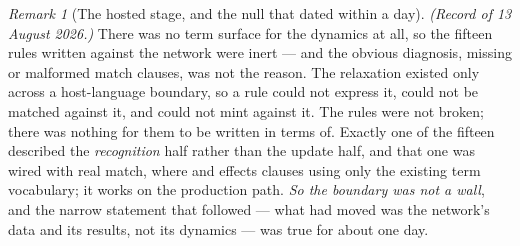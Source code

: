\documentclass[11pt,a4paper]{article}
\theoremstyle{remark}
\newtheorem{remark}[definition]{Remark}
\begin{document}
\begin{remark}[The hosted stage, and the null that dated within a day]\label{rem:hosted}
\emph{(Record of 13 August 2026.)} There was no term surface for the dynamics at all, so the fifteen
rules written against the network were inert --- and the
obvious diagnosis, missing or malformed match clauses, was not the reason. The relaxation existed only across a host-language boundary, so a
rule could not express it, could not be matched against it, and could not mint against it. The rules
were not broken; there was nothing for them to be written in terms of. Exactly one of the fifteen
described the \emph{recognition} half rather than the update half, and that one was wired with real
match, where and effects clauses using only the existing term vocabulary; it works on the production
path. \emph{So the boundary was not a wall}, and the narrow statement that followed --- what had moved
was the network's data and its results, not its dynamics --- was true for about one day.
\end{remark}
\end{document}
